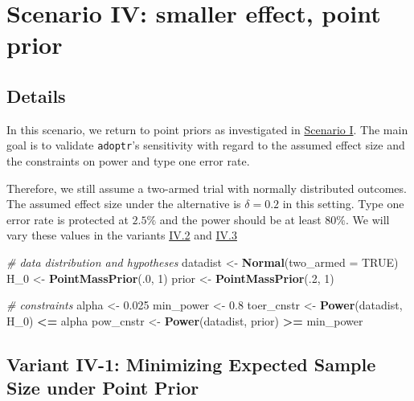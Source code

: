 \documentclass[
]{book}
\newenvironment{Shaded}{\begin{snugshade}}{\end{snugshade}}
\newcommand{\CommentTok}[1]{\textcolor[rgb]{0.56,0.35,0.01}{\textit{#1}}}
\newcommand{\DataTypeTok}[1]{\textcolor[rgb]{0.13,0.29,0.53}{#1}}
\newcommand{\DecValTok}[1]{\textcolor[rgb]{0.00,0.00,0.81}{#1}}
\newcommand{\FloatTok}[1]{\textcolor[rgb]{0.00,0.00,0.81}{#1}}
\newcommand{\KeywordTok}[1]{\textcolor[rgb]{0.13,0.29,0.53}{\textbf{#1}}}
\newcommand{\NormalTok}[1]{#1}
\newcommand{\OperatorTok}[1]{\textcolor[rgb]{0.81,0.36,0.00}{\textbf{#1}}}
\newcommand{\OtherTok}[1]{\textcolor[rgb]{0.56,0.35,0.01}{#1}}
\newcommand{\StringTok}[1]{\textcolor[rgb]{0.31,0.60,0.02}{#1}}
\begin{document}
\hypertarget{scenarioIV}{%
\chapter{Scenario IV: smaller effect, point prior}\label{scenarioIV}}

\hypertarget{details-3}{%
\section{Details}\label{details-3}}

In this scenario, we return to point priors as investigated in
\protect\hyperlink{scenarioI}{Scenario I}.
The main goal is to validate \texttt{adoptr}'s sensitivity with regard to
the assumed effect size and the constraints on power and type one error rate.

Therefore, we still assume a two-armed trial with normally distributed outcomes.
The assumed effect size under the alternative is \(\delta = 0.2\) in this setting.
Type one error rate is protected at \(2.5\%\) and the power should be at least
\(80\%\). We will vary these values in the variants \protect\hyperlink{variantIV.2}{IV.2} and
\protect\hyperlink{variantIV.3}{IV.3}

\begin{Shaded}
\begin{Highlighting}[]
\CommentTok{# data distribution and hypotheses}
\NormalTok{datadist   <-}\StringTok{ }\KeywordTok{Normal}\NormalTok{(}\DataTypeTok{two_armed =} \OtherTok{TRUE}\NormalTok{)}
\NormalTok{H_}\DecValTok{0}\NormalTok{        <-}\StringTok{ }\KeywordTok{PointMassPrior}\NormalTok{(.}\DecValTok{0}\NormalTok{, }\DecValTok{1}\NormalTok{)}
\NormalTok{prior      <-}\StringTok{ }\KeywordTok{PointMassPrior}\NormalTok{(.}\DecValTok{2}\NormalTok{, }\DecValTok{1}\NormalTok{)}

\CommentTok{# constraints}
\NormalTok{alpha      <-}\StringTok{ }\FloatTok{0.025}
\NormalTok{min_power  <-}\StringTok{ }\FloatTok{0.8}
\NormalTok{toer_cnstr <-}\StringTok{ }\KeywordTok{Power}\NormalTok{(datadist, H_}\DecValTok{0}\NormalTok{)   }\OperatorTok{<=}\StringTok{ }\NormalTok{alpha}
\NormalTok{pow_cnstr  <-}\StringTok{ }\KeywordTok{Power}\NormalTok{(datadist, prior) }\OperatorTok{>=}\StringTok{ }\NormalTok{min_power}
\end{Highlighting}
\end{Shaded}

\hypertarget{variantIV_1}{%
\section{Variant IV-1: Minimizing Expected Sample Size under Point Prior}\label{variantIV_1}}
\end{document}
